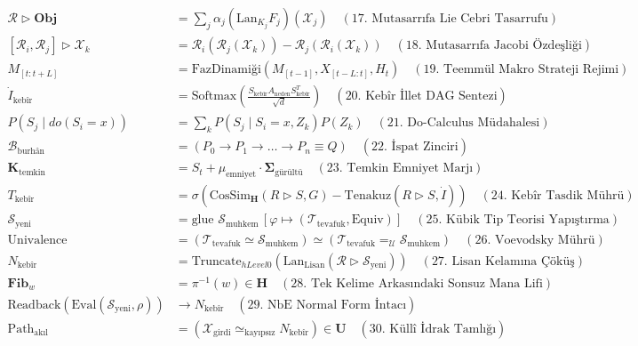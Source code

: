 \documentclass[11pt, a4paper]{article}
\begin{document}
\begin{align}
\mathcal{R} \triangleright \mathbf{Obj} &= \sum_j \alpha_j \left( \text{Lan}_{K_j} F_j \right)(\mathcal{X}_j) \quad (\text{17. Mutasarrıfa Lie Cebri Tasarrufu}) \\
[\mathcal{R}_i, \mathcal{R}_j] \triangleright \mathcal{X}_k &= \mathcal{R}_i(\mathcal{R}_j(\mathcal{X}_k)) - \mathcal{R}_j(\mathcal{R}_i(\mathcal{X}_k)) \quad (\text{18. Mutasarrıfa Jacobi Özdeşliği}) \\
M_{[t:t+L]} &= \text{FazDinamiği}(M_{[t-1]}, X_{[t-L:t]}, H_t) \quad (\text{19. Teemmül Makro Strateji Rejimi}) \\
\dot{I}_{\text{kebîr}} &= \text{Softmax}\left( \frac{S_{\text{kebîr}} A_{\text{neden}} S_{\text{kebîr}}^T}{\sqrt{d}} \right) \quad (\text{20. Kebîr İllet DAG Sentezi}) \\
P(S_j \mid do(S_i=x)) &= \sum_k P(S_j \mid S_i=x, Z_k) P(Z_k) \quad (\text{21. Do-Calculus Müdahalesi}) \\
\mathcal{B}_{\text{burhân}} &= (P_0 \to P_1 \to \dots \to P_n \equiv Q) \quad (\text{22. İspat Zinciri}) \\
\mathbf{K}_{\text{temkin}} &= S_t + \mu_{\text{emniyet}} \cdot \mathbf{\Sigma}_{\text{gürültü}} \quad (\text{23. Temkin Emniyet Marjı}) \\
T_{\text{kebîr}} &= \sigma(\text{CosSim}_{\mathbf{H}}(R \triangleright S, G) - \text{Tenakuz}(R \triangleright S, \dot{I})) \quad (\text{24. Kebîr Tasdik Mührü}) \\
\mathcal{S}_{\text{yeni}} &= \text{glue } \mathcal{S}_{\text{muhkem}} \, [\varphi \mapsto (\mathcal{T}_{\text{tevafuk}}, \text{Equiv})] \quad (\text{25. Kübik Tip Teorisi Yapıştırma}) \\
\text{Univalence} &= (\mathcal{T}_{\text{tevafuk}} \simeq \mathcal{S}_{\text{muhkem}}) \simeq (\mathcal{T}_{\text{tevafuk}} =_{\mathcal{U}} \mathcal{S}_{\text{muhkem}}) \quad (\text{26. Voevodsky Mührü}) \\
N_{\text{kebîr}} &= \text{Truncate}_{hLevel 0}(\text{Lan}_{\text{Lisan}}(\mathcal{R} \triangleright \mathcal{S}_{\text{yeni}})) \quad (\text{27. Lisan Kelamına Çöküş}) \\
\mathbf{Fib}_w &= \pi^{-1}(w) \in \mathbf{H} \quad (\text{28. Tek Kelime Arkasındaki Sonsuz Mana Lifi}) \\
\text{Readback}(\text{Eval}(\mathcal{S}_{\text{yeni}}, \rho)) &\longrightarrow N_{\text{kebîr}} \quad (\text{29. NbE Normal Form İntacı}) \\
\text{Path}_{\text{akıl}} &= (\mathcal{X}_{\text{girdi}} \simeq_{\text{kayıpsız}} N_{\text{kebîr}}) \in \mathbf{U} \quad (\text{30. Küllî İdrak Tamlığı})
\end{align}
\end{document}
